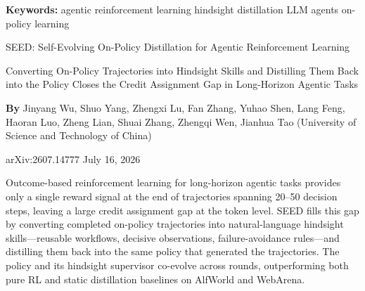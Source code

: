 \documentclass[10pt,twocolumn]{article}
\begin{document}
\setlength{\parindent}{0pt}
\setlength{\parskip}{4pt}

{\small\color{keywordgray}\textbf{Keywords:}
  agentic reinforcement learning \textbullet{}
  hindsight distillation \textbullet{}
  LLM agents \textbullet{}
  on-policy learning}\par\vspace{4pt}

{\LARGE\bfseries\raggedright
  SEED: Self-Evolving On-Policy Distillation
  for Agentic Reinforcement Learning}\par\vspace{4pt}

{\large\itshape\raggedright
  Converting On-Policy Trajectories into Hindsight Skills and
  Distilling Them Back into the Policy Closes the Credit
  Assignment Gap in Long-Horizon Agentic Tasks}\par\vspace{6pt}

{\small\textbf{By} Jinyang Wu, Shuo Yang, Zhengxi Lu, Fan Zhang,
  Yuhao Shen, Lang Feng, Haoran Luo, Zheng Lian, Shuai Zhang,
  Zhengqi Wen, Jianhua Tao
  (University of Science and Technology of China)}\par\vspace{2pt}

{\small\color{keywordgray}arXiv:2607.14777 \textbullet{} July 16, 2026}
\par\vspace{2pt}\noindent{\color{rulered}\rule{\columnwidth}{0.6pt}}\vspace{6pt}

Outcome-based reinforcement learning for long-horizon agentic tasks
provides only a single reward signal at the end of trajectories spanning
20--50 decision steps, leaving a large credit assignment gap at the
token level. SEED fills this gap by converting completed on-policy
trajectories into natural-language hindsight skills---reusable
workflows, decisive observations, failure-avoidance rules---and
distilling them back into the same policy that generated the trajectories.
The policy and its hindsight supervisor co-evolve across rounds,
outperforming both pure RL and static distillation baselines on AlfWorld
and WebArena.
\end{document}
